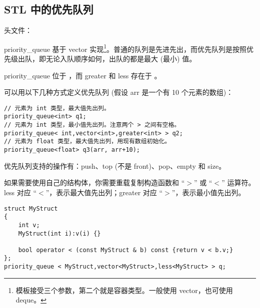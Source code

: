 \subsection{STL 中的优先队列}
	头文件：

	priority\_{}queue 基于 vector 实现\footnote{模板接受三个参数，第二个就是容器类型。一般使用 vector，也可使用 deque。}。普通的队列是先进先出，而优先队列是按照优先级出队，即无论入队顺序如何，出队的都是最大 (最小) 值。
	
	priority\_{}queue 位于 ，而 greater 和 less 存在于 。
	
	可以用以下几种方式定义优先队列 (假设 arr 是一个有 10 个元素的数组)：
	
\begin{lstlisting}
// 元素为 int 类型，最大值先出列。
priority_queue<int> q1;
// 元素为 int 类型，最小值先出列。注意两个 > 之间有空格。
priority_queue< int,vector<int>,greater<int> > q2;
// 元素为 float 类型，最大值先出列，用现有数组初始化。
priority_queue<float> q3(arr, arr+10);
\end{lstlisting}

	优先队列支持的操作有：push、top (不是 front)、pop、empty 和 size。
	
	如果需要使用自己的结构体，你需要重载复制构造函数和 “$>$” 或 “$<$” 运算符。less 对应 “$<$”，表示最大值先出列；greater 对应 “$>$”，表示最小值先出列。

\begin{lstlisting}
struct MyStruct
{
	int v;
	MyStruct(int i):v(i) {}
	
	bool operator < (const MyStruct & b) const {return v < b.v;}
};
priority_queue < MyStruct,vector<MyStruct>,less<MyStruct> > q;
\end{lstlisting}
